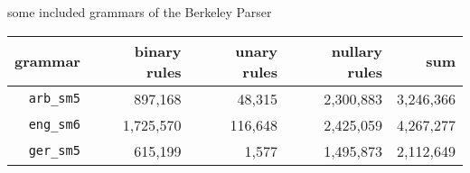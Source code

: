 \documentclass[beamer]{standalone}
\title{\jobname}
\begin{document}
\begin{standaloneframe}{\jobname}
	\begin{block}{some included grammars of the Berkeley Parser}
		\begin{center}
			\begin{tabular}{r|rrr|r}
				grammar & binary rules & unary rules & nullary rules & sum
			\\\hline
				\texttt{arb\_sm5} & 897,168 & 48,315 & 2,300,883 & 3,246,366
			\\
				\texttt{eng\_sm6} & 1,725,570 & 116,648 & 2,425,059 & 4,267,277
			\\
				\texttt{ger\_sm5} & 615,199 & 1,577 & 1,495,873 & 2,112,649
			\end{tabular}
		\end{center}
	\end{block}
\end{standaloneframe}
\end{document}
